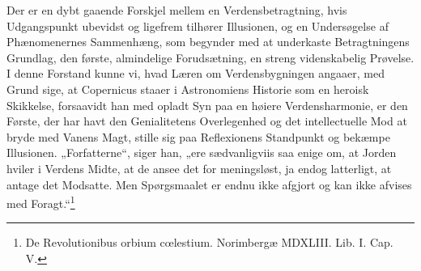 \documentclass[12pt,a4paper]{book}
\begin{document}
Der er en dybt gaaende Forskjel mellem en Verdensbetragtning, hvis
Udgangspunkt ubevidst og ligefrem tilhører Illusionen, og en
Undersøgelse af Phænomenernes Sammenhæng, som begynder med at
underkaste Betragtningens Grundlag, den første, almindelige
Forudsætning, en streng videnskabelig Prøvelse. I denne Forstand kunne
vi, hvad
Læren om Verdensbygningen angaaer, med Grund sige, at Copernicus staaer
i Astronomiens Historie som en heroisk Skikkelse, forsaavidt han med
opladt Syn paa en høiere Verdensharmonie, er den Første, der har havt
den Genialitetens Overlegenhed og det intellectuelle Mod at bryde med
Vanens Magt, stille sig paa Reflexionens Standpunkt og bekæmpe
Illusionen. „Forfatterne“, siger han, „ere sædvanligviis saa enige om,
at Jorden hviler i Verdens Midte, at de ansee det for meningsløst, ja
endog latterligt, at antage det Modsatte. Men Spørgsmaalet er endnu
ikke afgjort og kan ikke afvises med
Foragt.“\footnote{%
De Revolutionibus orbium cœlestium. Norimbergæ MDXLIII. Lib. I. Cap.
V.}
\end{document}
